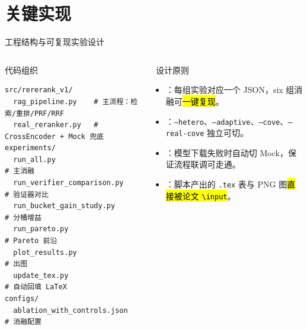 \section{关键实现}

\begin{frame}[fragile]{工程结构与可复现实验设计}
  \begin{columns}[T,onlytextwidth]
    \begin{block}{代码组织}
      \footnotesize
      \begin{lstlisting}[style=shellstyle, basicstyle=\ttfamily\tiny]
src/rererank_v1/
  rag_pipeline.py    # 主流程：检索/重排/PRF/RRF
  real_reranker.py   # CrossEncoder + Mock 兜底
experiments/
  run_all.py                    # 主消融
  run_verifier_comparison.py    # 验证器对比
  run_bucket_gain_study.py      # 分桶增益
  run_pareto.py                 # Pareto 前沿
  plot_results.py               # 出图
  update_tex.py                 # 自动回填 LaTeX
configs/
  ablation_with_controls.json   # 消融配置
      \end{lstlisting}
    \end{block}

    \begin{exampleblock}{\faCogs\ 设计原则}
      \footnotesize
      \begin{itemize}
        \item {}：每组实验对应一个 JSON，six 组消融可\hl{一键复现}。
        \item {}：\texttt{--hetero}、\texttt{--adaptive}、\texttt{--cove}、\texttt{--real-cove} 独立可切。
        \item {}：模型下载失败时自动切 Mock，保证流程联调可走通。
        \item {}：脚本产出的 \texttt{.tex} 表与 PNG 图\hl{直接被论文 \texttt{\textbackslash input}}。
      \end{itemize}
    \end{exampleblock}
  \end{columns}
\end{frame}

